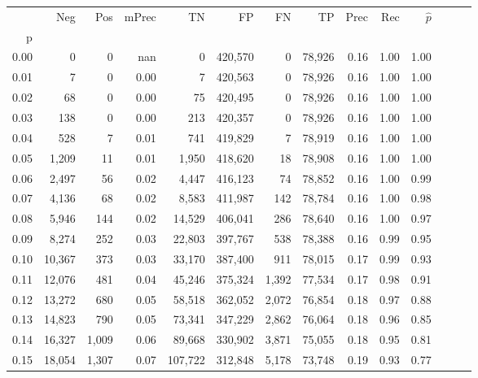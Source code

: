 \begin{tabular}{rrrrrrrrrrrrrr}
\toprule
{} &     Neg &    Pos & mPrec &       TN &       FP &      FN &      TP &  Prec &   Rec & $\hat{p}$ \\
p    &         &        &       &          &          &         &         &       &       &           \\
\midrule
0.00 &       0 &      0 &   nan &        0 &  420,570 &       0 &  78,926 &  0.16 &  1.00 &      1.00 \\
0.01 &       7 &      0 &  0.00 &        7 &  420,563 &       0 &  78,926 &  0.16 &  1.00 &      1.00 \\
0.02 &      68 &      0 &  0.00 &       75 &  420,495 &       0 &  78,926 &  0.16 &  1.00 &      1.00 \\
0.03 &     138 &      0 &  0.00 &      213 &  420,357 &       0 &  78,926 &  0.16 &  1.00 &      1.00 \\
0.04 &     528 &      7 &  0.01 &      741 &  419,829 &       7 &  78,919 &  0.16 &  1.00 &      1.00 \\
0.05 &   1,209 &     11 &  0.01 &    1,950 &  418,620 &      18 &  78,908 &  0.16 &  1.00 &      1.00 \\
0.06 &   2,497 &     56 &  0.02 &    4,447 &  416,123 &      74 &  78,852 &  0.16 &  1.00 &      0.99 \\
0.07 &   4,136 &     68 &  0.02 &    8,583 &  411,987 &     142 &  78,784 &  0.16 &  1.00 &      0.98 \\
0.08 &   5,946 &    144 &  0.02 &   14,529 &  406,041 &     286 &  78,640 &  0.16 &  1.00 &      0.97 \\
0.09 &   8,274 &    252 &  0.03 &   22,803 &  397,767 &     538 &  78,388 &  0.16 &  0.99 &      0.95 \\
0.10 &  10,367 &    373 &  0.03 &   33,170 &  387,400 &     911 &  78,015 &  0.17 &  0.99 &      0.93 \\
0.11 &  12,076 &    481 &  0.04 &   45,246 &  375,324 &   1,392 &  77,534 &  0.17 &  0.98 &      0.91 \\
0.12 &  13,272 &    680 &  0.05 &   58,518 &  362,052 &   2,072 &  76,854 &  0.18 &  0.97 &      0.88 \\
0.13 &  14,823 &    790 &  0.05 &   73,341 &  347,229 &   2,862 &  76,064 &  0.18 &  0.96 &      0.85 \\
0.14 &  16,327 &  1,009 &  0.06 &   89,668 &  330,902 &   3,871 &  75,055 &  0.18 &  0.95 &      0.81 \\
0.15 &  18,054 &  1,307 &  0.07 &  107,722 &  312,848 &   5,178 &  73,748 &  0.19 &  0.93 &      0.77 \\

\end{tabular}

